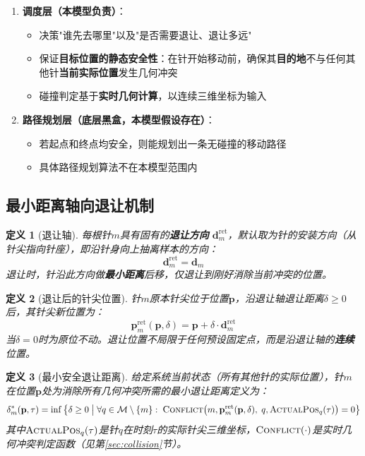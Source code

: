 \documentclass[11pt,a4paper]{article}
\newtheorem{definition}{定义}[section]
\begin{document}
\begin{enumerate}
    \item \textbf{调度层（本模型负责）}：
    \begin{itemize}
        \item 决策"谁先去哪里"以及"是否需要退让、退让多远"
        \item 保证\textbf{目标位置的静态安全性}：在针开始移动前，确保其\textbf{目的地}不与任何其他针\textbf{当前实际位置}发生几何冲突
        \item 碰撞判定基于\textbf{实时几何计算}，以连续三维坐标为输入
    \end{itemize}
    
    \item \textbf{路径规划层（底层黑盒，本模型假设存在）}：
    \begin{itemize}
        \item 若起点和终点均安全，则能规划出一条无碰撞的移动路径
        \item 具体路径规划算法不在本模型范围内
    \end{itemize}
\end{enumerate}

\subsection{最小距离轴向退让机制} \label{sec:retract}

\begin{definition}[退让轴]
每根针$m$具有固有的\textbf{退让方向} $\mathbf{d}_m^{\text{ret}}$，默认取为针的安装方向（从针尖指向针座），即沿针身向上抽离样本的方向：
\begin{equation}
    \mathbf{d}_m^{\text{ret}} = \mathbf{d}_m
\end{equation}
退让时，针沿此方向做\textbf{最小距离}后移，仅退让到刚好消除当前冲突的位置。
\end{definition}

\begin{definition}[退让后的针尖位置]
针$m$原本针尖位于位置$\mathbf{p}$，沿退让轴退让距离$\delta \geq 0$后，其针尖新位置为：
\begin{equation}
    \mathbf{p}_m^{\text{ret}}(\mathbf{p}, \delta) = \mathbf{p} + \delta \cdot \mathbf{d}_m^{\text{ret}}
\end{equation}
当$\delta = 0$时为原位不动。退让位置不局限于任何预设固定点，而是沿退让轴的\textbf{连续}位置。
\end{definition}

\begin{definition}[最小安全退让距离] \label{def:min_retract}
给定系统当前状态（所有其他针的实际位置），针$m$在位置$\mathbf{p}$处为消除所有几何冲突所需的最小退让距离定义为：
\begin{equation}
    \delta_m^*(\mathbf{p}, \tau) = \inf \left\{ \delta \geq 0 \;\middle|\; \forall q \in \mathcal{M} \setminus \{m\}: \; \textsc{Conflict}\big(m, \mathbf{p}_m^{\text{ret}}(\mathbf{p}, \delta), \; q, \textsc{ActualPos}_q(\tau)\big) = 0 \right\}
\end{equation}
其中$\textsc{ActualPos}_q(\tau)$是针$q$在时刻$\tau$的实际针尖三维坐标，$\textsc{Conflict}(\cdot)$是实时几何冲突判定函数（见第\ref{sec:collision}节）。
\end{definition}
\end{document}
